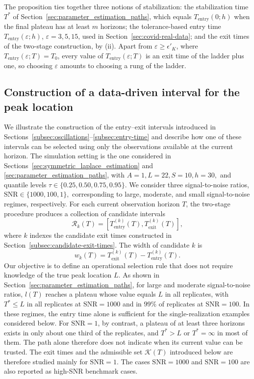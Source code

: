 \documentclass[12pt,a4paper]{article}
\begin{document}
The proposition ties together three notions of stabilization: the stabilization
time $T^{*}$ of Section~\ref{sec:parameter_estimation_paths}, which equals
$T_{\mathrm{entry}}(0;h)$ when the final plateau has at least $m$ horizons; the
tolerance-based entry time $T_{\mathrm{entry}}(\varepsilon;h)$, $\varepsilon=3,5,15$,
used in Section~\ref{sec:covid-real-data}; and the exit times of the two-stage
construction, by (ii). Apart from $\varepsilon\ge\epsilon'_K$, where
$T_{\mathrm{entry}}(\varepsilon;T)=T_0$, every value of $T_{\mathrm{entry}}(\varepsilon;T)$
is an exit time of the ladder plus one, so choosing $\varepsilon$ amounts to
choosing a rung of the ladder.

\subsection{Construction of a data-driven interval for the peak location}
\label{subsec:entry-exit-simulation}

We illustrate the construction of the entry--exit intervals introduced
in Sections~\ref{subsec:oscillations}--\ref{subsec:entry-time} and
describe how one of these intervals can be selected using only the
observations available at the current horizon. The simulation setting
is the one considered in
Sections~\ref{sec:symmetric_laplace_estimation} and
\ref{sec:parameter_estimation_paths}, with
\(
A=1,
L=22,
S=10,
h=30,
\)
and quantile levels
\(
\tau\in\{0.25,0.50,0.75,0.95\}.
\)
We consider three signal-to-noise ratios,
\(
\mathrm{SNR}\in\{1000,100,1\},
\)
corresponding to large, moderate, and small signal-to-noise regimes,
respectively.
For each current observation horizon $T$, the two-stage procedure
produces a collection of candidate intervals
\[
\mathcal R_k(T)
=
\left[
T_{\mathrm{entry}}^{(k)}(T),
T_{\mathrm{exit}}^{(k)}(T)
\right],
\]
where $k$ indexes the candidate exit times constructed in
Section~\ref{subsec:candidate-exit-times}. The width of candidate
$k$ is
\[
w_k(T)
=
T_{\mathrm{exit}}^{(k)}(T)
-
T_{\mathrm{entry}}^{(k)}(T).
\]
Our objective is to define an operational selection rule that does
not require knowledge of the true peak location $L$.
As shown in Section~\ref{sec:parameter_estimation_paths}, for large
and moderate signal-to-noise ratios, $\hat l(T)$ reaches a plateau
whose value equals $L$ in all replicates, with $T^*\le L$ in all
replicates at $\mathrm{SNR}=1000$ and in $99\%$ of replicates at
$\mathrm{SNR}=100$. In these regimes, the entry time alone is
sufficient for the single-realization examples considered below.
For $\mathrm{SNR}=1$, by contrast, a plateau of at least three
horizons exists in only about one third of the replicates, and
$T^*>L$ or $T^*=\infty$ in most of them. The path alone therefore
does not indicate when its current value can be trusted.
The exit times and the admissible set \(\mathcal K(T)\) introduced below are therefore studied mainly for \(\mathrm{SNR}=1\). The cases \(\mathrm{SNR}=1000\) and \(\mathrm{SNR}=100\) are also reported as high-SNR benchmark cases.
\end{document}

